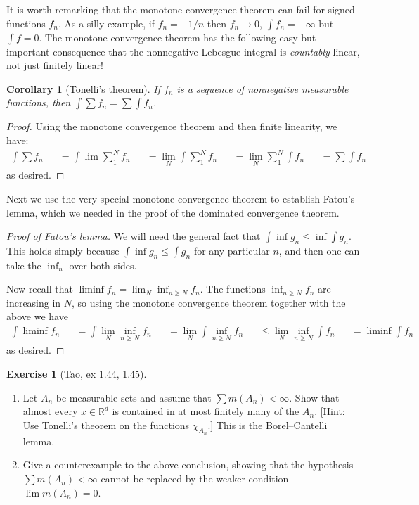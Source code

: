 \documentclass[10pt,oneside]{amsbook}
\newcommand{\RR}{{\mathbb R}}
\theoremstyle{definition}
\newtheorem{exerc}{Exercise}[section]
\theoremstyle{plain}
\newtheorem{cor}[thm]{Corollary}
\theoremstyle{definition}
\theoremstyle{remark}
\numberwithin{equation}{section}
\numberwithin{figure}{section}
\begin{document}
It is worth remarking that the monotone convergence theorem can fail for signed functions $f_n$. As a silly example, if $f_n=-1/n$ then $f_n\to0$, $\int f_n=-\infty$ but $\int f=0$. The monotone convergence theorem has the following easy but important consequence that the nonnegative Lebesgue integral is \emph{countably} linear, not just finitely linear!

\begin{cor}[Tonelli's theorem]
  If $f_n$ is a sequence of nonnegative measurable functions, then $\int\sum f_n=\sum\int f_n$.
\end{cor}

\begin{proof}
  Using the monotone convergence theorem and then finite linearity, we have:
  \begin{align*}
    \int\sum f_n
    &&=\int\lim\sum_1^Nf_n
    &&=\lim_N\int\sum_1^Nf_n
    &&=\lim_N\sum_1^N\int f_n
    &&=\sum\int f_n
  \end{align*}
  as desired.
\end{proof}

Next we use the very special monotone convergence theorem to establish Fatou's lemma, which we needed in the proof of the dominated convergence theorem.

\begin{proof}[Proof of Fatou's lemma]
  We will need the general fact that $\int\inf g_n\leq\inf\int g_n$. This holds simply because $\int\inf g_n\leq\int g_n$ for any particular $n$, and then one can take the $\inf_n$ over both sides.

  Now recall that $\liminf f_n=\lim_N\inf_{n\geq N}f_n$. The functions $\inf_{n\geq N}f_n$ are increasing in $N$, so using the monotone convergence theorem together with the above we have
  \begin{align*}
    \int\liminf f_n&&=\int\lim_N\inf_{n\geq N} f_n
                    &&=\lim_N\int\inf_{n\geq N}f_n
                    &&\leq\lim_N\inf_{n\geq N}\int f_n
                    &&=\liminf\int f_n
  \end{align*}
  as desired.
\end{proof}

\begin{exerc}[Tao, ex 1.44, 1.45]
  \begin{enumerate}
    \item Let $A_n$ be measurable sets and assume that $\sum m(A_n)<\infty$. Show that almost every $x\in\RR^d$ is contained in at most finitely many of the $A_n$. [Hint: Use Tonelli's theorem on the functions $\chi_{A_n}$.] This is the Borel--Cantelli lemma.
    \item Give a counterexample to the above conclusion, showing that the hypothesis $\sum m(A_n)<\infty$ cannot be replaced by the weaker condition $\lim m(A_n)=0$.
  \end{enumerate}
\end{exerc}
\end{document}
